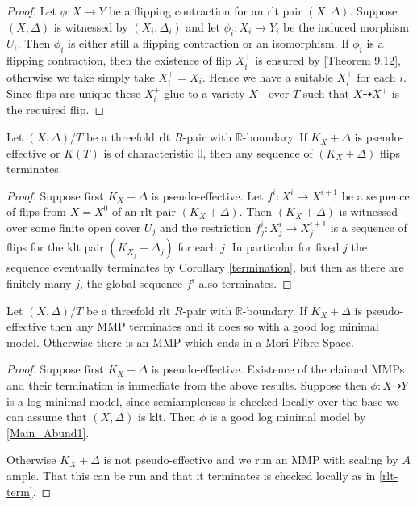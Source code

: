 	\begin{proof}
	Let $\phi:X \to Y$ be a flipping contraction for an rlt pair $(X,\Delta)$. Suppose $(X,\Delta)$ is witnessed by $(X_{i},\Delta_{i})$ and let $\phi_{i}:X_{i} \to Y_{i}$ be the induced morphism $U_{i}$. Then $\phi_{i}$ is either still a flipping contraction or an isomorphism. If $\phi_{i}$ is a flipping contraction, then the existence of flip $X_{i}^{+}$ is ensured by \cite{bhatt2020}[Theorem 9.12], otherwise we take simply take $X_{i}^{+}=X_{i}$. Hence we have a suitable $X_{i}^{+}$ for each $i$. Since flips are unique these $X_{i}^{+}$ glue to a variety $X^{+}$ over $T$ such that $X \dashrightarrow X^{+}$ is the required flip.
	\end{proof}
	
	\begin{theorem}\label{rlt-term}
		Let $(X,\Delta)/T$ be a threefold rlt $R$-pair with $\mathbb{R}$-boundary. If $K_{X}+\Delta$ is pseudo-effective or $K(T)$ is of characteristic $0$, then any sequence of $(K_{X}+\Delta)$ flips terminates.
	\end{theorem}
	
	\begin{proof}
		
		Suppose first $K_{X}+\Delta$ is pseudo-effective. Let $f^{i}:X^{i} \to X^{i+1}$ be a sequence of flips from $X=X^{0}$ of an rlt pair $(K_{X}+\Delta)$. Then $(K_{X}+\Delta)$ is witnessed over some finite open cover $U_{j}$ and the restriction $f^{i}_{j}:X_{j}^{i} \to X_{j}^{i+1}$ is a sequence of flips for the klt pair $(K_{X_{j}}+\Delta_{j})$ for each $j$. In particular for fixed $j$ the sequence eventually terminates by Corollary \ref{termination}, but then as there are finitely many $j$, the global sequence $f^{i}$ also terminates.
	\end{proof}

\begin{theorem}\label{rltmmp}
	Let $(X,\Delta)/T$ be a threefold rlt $R$-pair with $\mathbb{R}$-boundary. If $K_{X}+\Delta$ is pseudo-effective then any MMP terminates and it does so with a good log minimal model. Otherwise there is an MMP which ends in a Mori Fibre Space. 
\end{theorem}


\begin{proof}
	Suppose first $K_{X}+\Delta$ is pseudo-effective.
	Existence of the claimed MMPs and their termination is immediate from the above results. Suppose then $\phi:X \dashrightarrow Y$ is a log minimal model, since semiampleness is checked locally over the base we can assume that $(X,\Delta)$ is klt. Then $\phi$ is a good log minimal model by \autoref{Main_Abund1}.
	
	Otherwise $K_{X}+\Delta$ is not pseudo-effective and we run an MMP with scaling by $A$ ample. That this can be run and that it terminates is checked locally as in \autoref{rlt-term}.
\end{proof}


